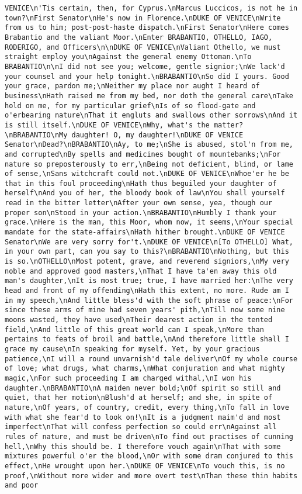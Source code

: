 \begin{verbatim}
VENICE\n'Tis certain, then, for Cyprus.\nMarcus Luccicos, is not he in town?\nFirst Senator\nHe's now in Florence.\nDUKE OF VENICE\nWrite from us to him; post-post-haste dispatch.\nFirst Senator\nHere comes Brabantio and the valiant Moor.\nEnter BRABANTIO, OTHELLO, IAGO, RODERIGO, and Officers\n\nDUKE OF VENICE\nValiant Othello, we must straight employ you\nAgainst the general enemy Ottoman.\nTo BRABANTIO\n\nI did not see you; welcome, gentle signior;\nWe lack'd your counsel and your help tonight.\nBRABANTIO\nSo did I yours. Good your grace, pardon me;\nNeither my place nor aught I heard of business\nHath raised me from my bed, nor doth the general care\nTake hold on me, for my particular grief\nIs of so flood-gate and o'erbearing nature\nThat it engluts and swallows other sorrows\nAnd it is still itself.\nDUKE OF VENICE\nWhy, what's the matter?\nBRABANTIO\nMy daughter! O, my daughter!\nDUKE OF VENICE Senator\nDead?\nBRABANTIO\nAy, to me;\nShe is abused, stol'n from me, and corrupted\nBy spells and medicines bought of mountebanks;\nFor nature so preposterously to err,\nBeing not deficient, blind, or lame of sense,\nSans witchcraft could not.\nDUKE OF VENICE\nWhoe'er he be that in this foul proceeding\nHath thus beguiled your daughter of herself\nAnd you of her, the bloody book of law\nYou shall yourself read in the bitter letter\nAfter your own sense, yea, though our proper son\nStood in your action.\nBRABANTIO\nHumbly I thank your grace.\nHere is the man, this Moor, whom now, it seems,\nYour special mandate for the state-affairs\nHath hither brought.\nDUKE OF VENICE Senator\nWe are very sorry for't.\nDUKE OF VENICE\n[To OTHELLO] What, in your own part, can you say to this?\nBRABANTIO\nNothing, but this is so.\nOTHELLO\nMost potent, grave, and reverend signiors,\nMy very noble and approved good masters,\nThat I have ta'en away this old man's daughter,\nIt is most true; true, I have married her:\nThe very head and front of my offending\nHath this extent, no more. Rude am I in my speech,\nAnd little bless'd with the soft phrase of peace:\nFor since these arms of mine had seven years' pith,\nTill now some nine moons wasted, they have used\nTheir dearest action in the tented field,\nAnd little of this great world can I speak,\nMore than pertains to feats of broil and battle,\nAnd therefore little shall I grace my cause\nIn speaking for myself. Yet, by your gracious patience,\nI will a round unvarnish'd tale deliver\nOf my whole course of love; what drugs, what charms,\nWhat conjuration and what mighty magic,\nFor such proceeding I am charged withal,\nI won his daughter.\nBRABANTIO\nA maiden never bold;\nOf spirit so still and quiet, that her motion\nBlush'd at herself; and she, in spite of nature,\nOf years, of country, credit, every thing,\nTo fall in love with what she fear'd to look on!\nIt is a judgment maim'd and most imperfect\nThat will confess perfection so could err\nAgainst all rules of nature, and must be driven\nTo find out practises of cunning hell,\nWhy this should be. I therefore vouch again\nThat with some mixtures powerful o'er the blood,\nOr with some dram conjured to this effect,\nHe wrought upon her.\nDUKE OF VENICE\nTo vouch this, is no proof,\nWithout more wider and more overt test\nThan these thin habits and poor 
\end{verbatim}

